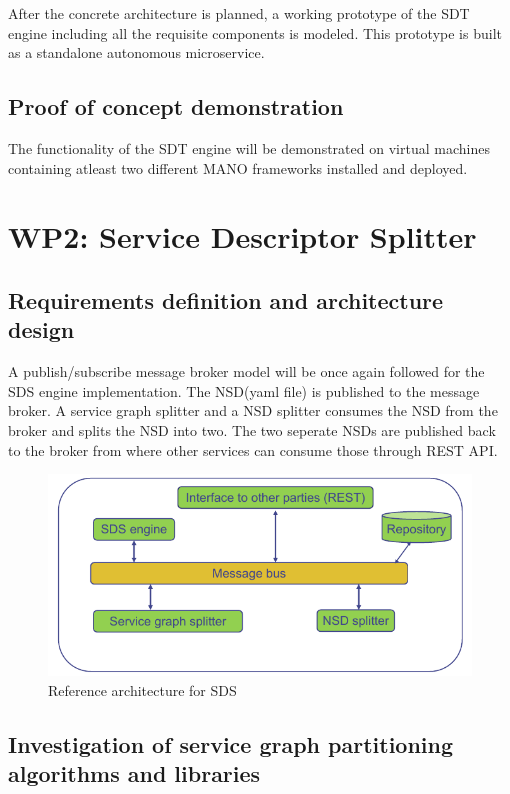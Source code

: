After the concrete architecture is planned, a working prototype of the SDT engine including all the requisite components is modeled. This prototype is built as a standalone autonomous microservice.
\subsection{Proof of concept demonstration}

The functionality of the SDT engine will be demonstrated on virtual machines containing atleast two different MANO frameworks installed and deployed. 

\section{WP2: Service Descriptor Splitter}

\subsection{Requirements definition and architecture design}

  A publish/subscribe message broker model will be once again followed for the SDS engine implementation. The NSD(yaml file) is published to the message broker. A service graph splitter and a NSD splitter consumes the NSD from the broker and splits the NSD into two. The two seperate NSDs are published back to the broker from where other services can consume those through REST API.
\begin{figure}[h]
	\centering
	\includegraphics[width=0.9\linewidth]{figures/wp2Arch}
	\caption{Reference architecture for SDS \cite{WPDescriptionsPDF}}
	\label{fig:wp2arch}
\end{figure}

\subsection{Investigation of service graph partitioning algorithms and libraries}

